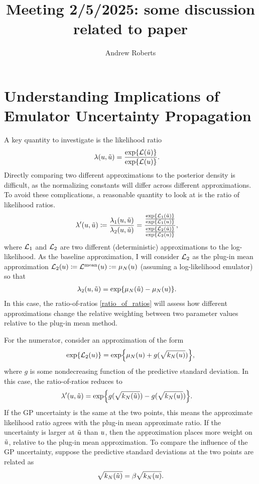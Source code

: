 \documentclass[12pt]{article}
\title{Meeting 2/5/2025: some discussion related to paper}
\author{Andrew Roberts}
\begin{document}
\section{Understanding Implications of Emulator Uncertainty Propagation}
A key quantity to investigate is the likelihood ratio
\begin{align}
\lambda(u, \tilde{u}) &= \frac{\exp\mathopen{}\left\{\mathcal{L}(\tilde{u})\right\}\mathclose{}}{\exp\mathopen{}\left\{\mathcal{L}(u)\right\}\mathclose{}}.
\end{align}
Directly comparing two different approximations to the posterior density is difficult, as the normalizing 
constants will differ across different approximations. To avoid these complications, a reasonable quantity
to look at is the ratio of likelihood ratios.
\begin{align}
\lambda^\prime(u, \tilde{u}) &\coloneqq \frac{\lambda_1(u, \tilde{u})}{\lambda_2(u, \tilde{u})}  
= \frac{\frac{\exp\mathopen{}\left\{\mathcal{L}_1(\tilde{u})\right\}\mathclose{}}{\exp\mathopen{}\left\{\mathcal{L}_1(u)\right\}\mathclose{}}}{\frac{\exp\mathopen{}\left\{\mathcal{L}_2(\tilde{u})\right\}\mathclose{}}{\exp\mathopen{}\left\{\mathcal{L}_2(u)\right\}\mathclose{}}}, \label{ratio_of_ratios}
\end{align}
where $\mathcal{L}_1$ and $\mathcal{L}_2$ are two different (deterministic) approximations to the log-likelihood. As the baseline approximation, I will 
consider $\mathcal{L}_2$ as the plug-in mean approximation $\mathcal{L}_2(u) \coloneqq \mathcal{L}^{\text{mean}}(u) := \mu_{N}(u)$ 
(assuming a log-likelihood emulator) so that
\begin{align}
\lambda_2(u, \tilde{u}) &= \exp\mathopen{}\left\{\mu_{N}(\tilde{u}) - \mu_{N}(u)\right\}\mathclose{}.
\end{align}
In this case, the ratio-of-ratios \ref{ratio_of_ratios} will assess how different approximations change the relative weighting between 
two parameter values relative to the plug-in mean method.

For the numerator, consider an approximation of the form
\begin{align}
\exp\mathopen{}\left\{\mathcal{L}_2(u)\right\}\mathclose{} = \exp\mathopen{}\left\{\mu_{N}(u) + g(\sqrt{k_{N}(u)})\right\}\mathclose{},
\end{align}
where $g$ is some nondecreasing function of the predictive standard deviation. In this case, the ratio-of-ratios reduces to
\begin{align}
\lambda^\prime(u, \tilde{u}) &= \exp\mathopen{}\left\{g(\sqrt{k_{N}(\tilde{u})}) - g(\sqrt{k_{N}(u)})\right\}\mathclose{}.
\end{align}
If the GP uncertainty is the same at the two points, this means the approximate likelihood ratio agrees with the plug-in mean 
approximate ratio. If the uncertainty is larger at $\tilde{u}$ than $u$, then the approximation places more weight on 
$\tilde{u}$, relative to the plug-in mean approximation. To compare the influence of the GP uncertainty, suppose the predictive
standard deviations at the two points are related as
\begin{align}
\sqrt{k_{N}(\tilde{u})} = \beta \sqrt{k_{N}(u)}.
\end{align}
\end{document}
